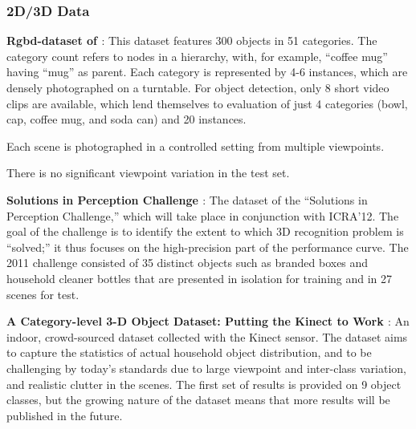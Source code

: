 \subsubsection{2D/3D Data}
{\bf Rgbd-dataset of \cite{Lai2011}}:
This dataset features 300 objects in 51 categories.
The category count refers to nodes in a hierarchy, with, for example, ``coffee mug'' having ``mug'' as parent.
Each category is represented by 4-6 instances, which are densely photographed on a turntable.
For object detection, only 8 short video clips are available, which lend themselves to evaluation of just 4 categories (bowl, cap, coffee mug, and soda can) and 20 instances.

Each scene is photographed in a controlled setting from multiple viewpoints.

There is no significant viewpoint variation in the test set.

{\bf Solutions in Perception Challenge \cite{SIPC2011}}:
The dataset of the ``Solutions in Perception Challenge,'' which will take place in conjunction with ICRA'12.
The goal of the challenge is to identify the extent to which 3D recognition problem is ``solved;'' it thus focuses on the high-precision part of the performance curve.
The 2011 challenge consisted of 35 distinct objects such as branded boxes and household cleaner bottles that are presented in isolation for training and in 27 scenes for test.

{\bf A Category-level 3-D Object Dataset: Putting the Kinect to Work \cite{Janoch2011}}:
An indoor, crowd-sourced dataset collected with the Kinect sensor.
The dataset aims to capture the statistics of actual household object distribution, and to be challenging by today's standards due to large viewpoint and inter-class variation, and realistic clutter in the scenes.
The first set of results is provided on 9 object classes, but the growing nature of the dataset means that more results will be published in the future.

